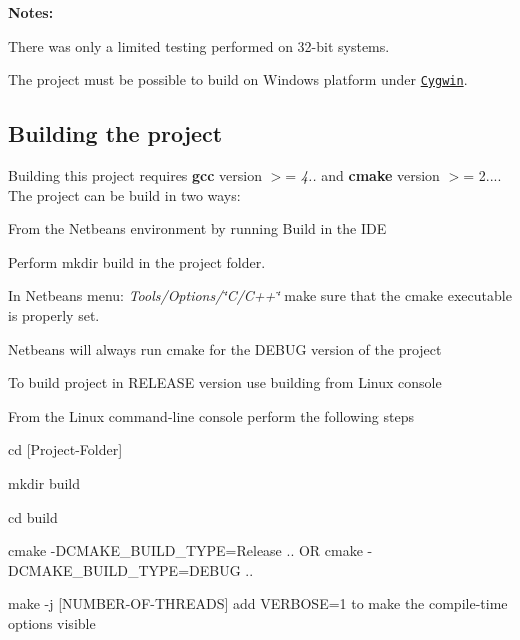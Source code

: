 {\bfseries Notes\+:}


\begin{DoxyEnumerate}
\item There was only a limited testing performed on 32-\/bit systems.
\item The project must be possible to build on Windows platform under \href{https://www.cygwin.com/}{\tt Cygwin}.
\end{DoxyEnumerate}

\subsection*{Building the project}

Building this project requires {\bfseries gcc} version $>$= {\itshape 4..} and {\bfseries cmake} version $>$= 2.... The project can be build in two ways\+:


\begin{DoxyItemize}
\item From the Netbeans environment by running Build in the I\+D\+E
\begin{DoxyItemize}
\item Perform {\ttfamily mkdir build} in the project folder.
\item In Netbeans menu\+: {\itshape Tools/\+Options/\char`\"{}\+C/\+C++\char`\"{}} make sure that the cmake executable is properly set.
\item Netbeans will always run cmake for the D\+E\+B\+U\+G version of the project
\item To build project in R\+E\+L\+E\+A\+S\+E version use building from Linux console
\end{DoxyItemize}
\item From the Linux command-\/line console perform the following steps
\begin{DoxyItemize}
\item {\ttfamily cd \mbox{[}Project-\/\+Folder\mbox{]}}
\item {\ttfamily mkdir build}
\item {\ttfamily cd build}
\item {\ttfamily cmake -\/\+D\+C\+M\+A\+K\+E\+\_\+\+B\+U\+I\+L\+D\+\_\+\+T\+Y\+P\+E=Release ..} O\+R {\ttfamily cmake -\/\+D\+C\+M\+A\+K\+E\+\_\+\+B\+U\+I\+L\+D\+\_\+\+T\+Y\+P\+E=D\+E\+B\+U\+G ..}
\item {\ttfamily make -\/j \mbox{[}N\+U\+M\+B\+E\+R-\/\+O\+F-\/\+T\+H\+R\+E\+A\+D\+S\mbox{]}} add {\ttfamily V\+E\+R\+B\+O\+S\+E=1} to make the compile-\/time options visible
\end{DoxyItemize}
\end{DoxyItemize}


